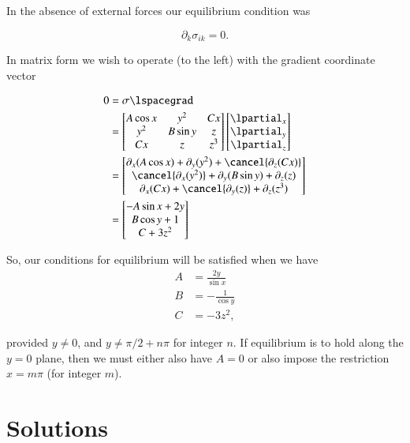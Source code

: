 \begin{Answer}[ref={problem:continuumProblemSet1:q4}]
In the absence of external forces our equilibrium condition was

\begin{equation}\label{eqn:continuumProblemSet1:530}
\partial_k \sigma_{ik} = 0.
\end{equation}

In matrix form we wish to operate (to the left) with the gradient coordinate vector

\begin{align*}
0 
&= \sigma \lspacegrad \\
&=
\begin{bmatrix}
A \cos x & y^2 & C x \\
y^2 & B \sin y & z \\
C x & z & z^3
\end{bmatrix}
\begin{bmatrix}
\lpartial_x \\
\lpartial_y \\
\lpartial_z \\
\end{bmatrix} \\
&=
\begin{bmatrix}
\partial_x (A \cos x) + \partial_y(y^2) + \cancel{\partial_z(C x)} \\
\cancel{\partial_x (y^2)} + \partial_y(B \sin y) + \partial_z(z) \\
\partial_x (C x) + \cancel{\partial_y(z)} + \partial_z(z^3)
\end{bmatrix} \\
&=
\begin{bmatrix}
-A \sin x + 2 y \\
B \cos y + 1 \\
C + 3 z^2 
\end{bmatrix} \\
\end{align*}

So, our conditions for equilibrium will be satisfied when we have
\begin{align}\label{eqn:continuumProblemSet1:550}
A &= \frac{2 y }{\sin x} \\
B &= -\frac{1}{\cos y} \\
C &= -3 z^2,
\end{align}

provided $y \ne 0$, and $y \ne \pi/2 + n\pi$ for integer $n$.  If equilibrium is to hold along the $y = 0$ plane, then we must either also have $A = 0$ or also impose the restriction $x = m \pi$ (for integer $m$).

\end{Answer}

\section{Solutions}

\shipoutAnswer
